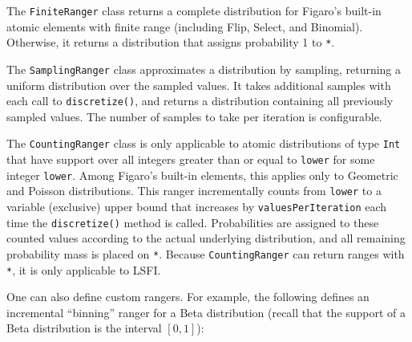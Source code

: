 The \texttt{FiniteRanger} class returns a complete distribution for Figaro's built-in atomic elements with finite range (including Flip, Select, and Binomial). Otherwise, it returns a distribution that assigns probability 1 to \texttt{*}.

The \texttt{SamplingRanger} class approximates a distribution by sampling, returning a uniform distribution over the sampled values. It takes additional samples with each call to \texttt{discretize()}, and returns a distribution containing all previously sampled values. The number of samples to take per iteration is configurable.

The \texttt{CountingRanger} class is only applicable to atomic distributions of type \texttt{Int} that have support over all integers greater than or equal to \texttt{lower} for some integer \texttt{lower}. Among Figaro's built-in elements, this applies only to Geometric and Poisson distributions. This ranger incrementally counts from \texttt{lower} to a variable (exclusive) upper bound that increases by \texttt{valuesPerIteration} each time the \texttt{discretize()} method is called. Probabilities are assigned to these counted values according to the actual underlying distribution, and all remaining probability mass is placed on \texttt{*}. Because \texttt{CountingRanger} can return ranges with \texttt{*}, it is only applicable to LSFI.

One can also define custom rangers. For example, the following defines an incremental ``binning'' ranger for a Beta distribution (recall that the support of a Beta distribution is the interval $[0,1]$):

